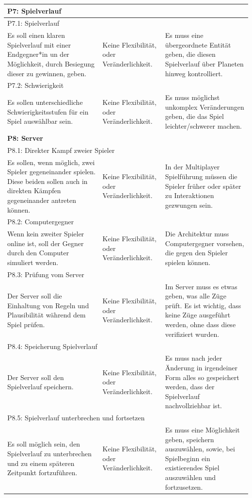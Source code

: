 \documentclass[fontsize=12pt,paper=a4,twoside]{scrartcl}
\begin{document}
\begin{longtable}[c]{|p{5cm}|p{5cm}|p{5cm}|}
\\ \hline
%
\multicolumn{3}{|l|}{{\textbf{P7: Spielverlauf}}} 
\\ \hline
\multicolumn{3}{|l|}{{P7.1: Spielverlauf}} 
\\ \hline
Es soll einen klaren Spielverlauf mit einer Endgegner*in un der Möglichkeit, durch Besiegung dieser zu gewinnen, geben.  & Keine Flexibilität, oder Veränderlichkeit.    & Es muss eine übergeordnete Entität geben, die diesen Spielverlauf über Planeten hinweg kontrolliert. 
\\ \hline
\multicolumn{3}{|l|}{{P7.2: Schwierigkeit}} 
\\ \hline
Es sollen unterschiedliche Schwierigkeitsstufen für ein Spiel auswählbar sein. & Keine Flexibilität, oder Veränderlichkeit.    & Es muss möglichst unkomplex Veränderungen geben, die das Spiel leichter/schwerer machen. 
\\ \hline
%
\multicolumn{3}{|l|}{{\textbf{P8: Server}}} 
\\ \hline
\multicolumn{3}{|l|}{{P8.1: Direkter Kampf zweier Spieler}} 
\\ \hline
Es sollen, wenn möglich, zwei Spieler gegeneinander spielen. Diese beiden sollen auch in direkten Kämpfen gegeneinander antreten können. & Keine Flexibilität, oder Veränderlichkeit.  & In der Multiplayer Spielführung müssen die Spieler früher oder später zu Interaktionen gezwungen sein. 
\\ \hline
\multicolumn{3}{|l|}{{P8.2: Computergegner}} 
\\ \hline
Wenn kein zweiter Spieler online ist, soll der Gegner durch den Computer simuliert werden. & Keine Flexibilität, oder Veränderlichkeit.    & Die Architektur muss Computergegner vorsehen, die gegen den Spieler spielen können. 
\\ \hline
\multicolumn{3}{|l|}{{P8.3: Prüfung vom Server}} 
\\ \hline
Der Server soll die Einhaltung von Regeln und Plausibilität während dem Spiel prüfen.  & Keine Flexibilität, oder Veränderlichkeit.    & Im Server muss es etwas geben, was alle Züge prüft. Es ist wichtig, dass keine Züge ausgeführt werden, ohne dass diese verifiziert wurden. 
\\ \hline
\multicolumn{3}{|l|}{{P8.4: Speicherung Spielverlauf}} 
\\ \hline
Der Server soll den Spielverlauf speichern. & Keine Flexibilität, oder Veränderlichkeit.    & Es muss nach jeder Änderung in irgendeiner Form alles so gespeichert werden, dass der Spielverlauf nachvollziehbar ist. 
\\ \hline
\multicolumn{3}{|l|}{{P8.5: Spielverlauf unterbrechen und fortsetzen}} 
\\ \hline
Es soll möglich sein, den Spielverlauf zu unterbrechen und zu einem späteren Zeitpunkt fortzuführen. & Keine Flexibilität, oder Veränderlichkeit.    & Es muss eine Möglichkeit geben, speichern auszuwählen, sowie, bei Spielbeginn ein existierendes Spiel auszuwählen und fortzusetzen. 
\\ \hline
\end{longtable}
\end{document}
